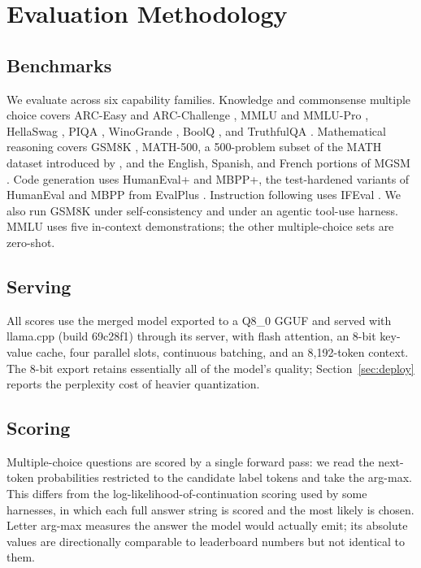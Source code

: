 \section{Evaluation Methodology}
\label{sec:method}

\subsection{Benchmarks}
We evaluate across six capability families. Knowledge and commonsense multiple choice covers ARC-Easy and ARC-Challenge \citep{clark2018arc}, MMLU \citep{hendrycks2021mmlu} and MMLU-Pro \citep{wang2024mmlupro}, HellaSwag \citep{zellers2019hellaswag}, PIQA \citep{bisk2019piqa}, WinoGrande \citep{sakaguchi2019winogrande}, BoolQ \citep{clark2019boolq}, and TruthfulQA \citep{lin2022truthfulqa}. Mathematical reasoning covers GSM8K \citep{cobbe2021gsm8k}, MATH-500, a 500-problem subset of the MATH dataset \citep{hendrycks2021math} introduced by \citet{lightman2023prm}, and the English, Spanish, and French portions of MGSM \citep{shi2022mgsm}. Code generation uses HumanEval+ and MBPP+, the test-hardened variants of HumanEval \citep{chen2021humaneval} and MBPP \citep{austin2021mbpp} from EvalPlus \citep{liu2023evalplus}. Instruction following uses IFEval \citep{zhou2023ifeval}. We also run GSM8K under self-consistency and under an agentic tool-use harness. MMLU uses five in-context demonstrations; the other multiple-choice sets are zero-shot.

\subsection{Serving}
All scores use the merged model exported to a Q8\_0 GGUF and served with llama.cpp \citep{gerganov2023llamacpp} (build 69c28f1) through its server, with flash attention, an 8-bit key-value cache, four parallel slots, continuous batching, and an 8{,}192-token context. The 8-bit export retains essentially all of the model's quality; Section~\ref{sec:deploy} reports the perplexity cost of heavier quantization.

\subsection{Scoring}
Multiple-choice questions are scored by a single forward pass: we read the next-token probabilities restricted to the candidate label tokens and take the arg-max. This differs from the log-likelihood-of-continuation scoring used by some harnesses, in which each full answer string is scored and the most likely is chosen. Letter arg-max measures the answer the model would actually emit; its absolute values are directionally comparable to leaderboard numbers but not identical to them.

